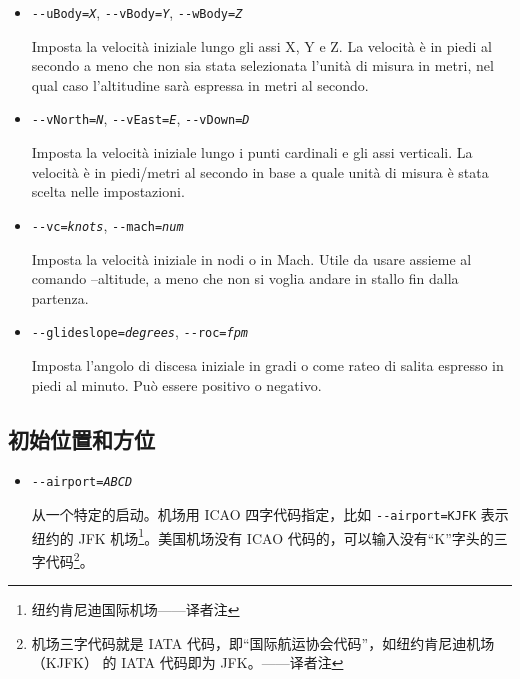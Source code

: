 \begin{itemize}
{\begin{itemize}
  Set the initial  of the aircraft. All values default to 0 - heading North, in straight and level flight.

  \item{\texttt{-$ $-uBody={\it X}}, \texttt{-$ $-vBody={\it Y}}, \texttt{-$ $-wBody={\it Z}}}

  Imposta la velocit\`{a} iniziale lungo gli assi X, Y e Z. La velocit\`{a} \`{e} in piedi al secondo a meno che non
  sia stata selezionata l'unit\`{a} di misura in metri, nel qual caso l'altitudine sar\`{a} espressa in metri al secondo.

  \item{\texttt{-$ $-vNorth={\it N}}, \texttt{-$ $-vEast={\it E}}, \texttt{-$ $-vDown={\it D}}}

  Imposta la velocit\`{a} iniziale lungo i punti cardinali e gli assi verticali.
  La velocit\`{a} \`{e} in piedi/metri al secondo in base a quale unit\`{a} di misura \`{e} stata scelta nelle impostazioni.

  \item{\texttt{-$ $-vc={\it knots}}, \texttt{-$ $-mach={\it num}}}

  Imposta la velocit\`{a} iniziale in nodi o in Mach. Utile da usare assieme al comando --altitude, a meno che non
  si voglia andare in stallo fin dalla partenza.

  \item{\texttt{-$ $-glideslope={\it degrees}}, \texttt{-$ $-roc={\it fpm}}}

  Imposta l'angolo di discesa iniziale in gradi o come rateo di salita espresso in piedi al minuto.
  Pu\`{o} essere positivo o negativo.

  \end{itemize}
}

\ifchinese
{
  \subsection{初始位置和方位\label{aiportid}}
\begin{itemize}
\item{\texttt{-$ $-airport={\it ABCD}}}

 从一个特定的启动。机场用 ICAO 四字代码指定，比如 \texttt{-$ $-airport=KJFK} 表示纽约的 JFK 机场\footnote{纽约肯尼迪国际机场——译者注}。美国机场没有 ICAO 代码的，可以输入没有“K”字头的三字代码\footnote{机场三字代码就是 IATA 代码，即“国际航运协会代码”，如纽约肯尼迪机场（KJFK） 的 IATA 代码即为 JFK。——译者注}。


\end{itemize}}
\end{itemize}
